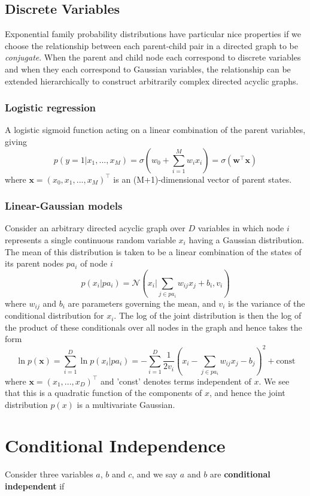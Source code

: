 \documentclass[a3paper, 12pt]{book} %
\begin{document}
\subsection{Discrete Variables}
Exponential family probability distributions have particular nice properties if we choose the relationship between each parent-child pair in a directed graph to be \emph{conjugate}. When the parent and child node each correspond to discrete variables and when they each correspond to Gaussian variables, the relationship can be extended hierarchically to construct arbitrarily complex directed acyclic graphs.

\subsubsection{Logistic regression}
A logistic sigmoid function acting on a linear combination of the parent variables, giving 
$$p(y=1|x_1,...,x_M)=\sigma{(w_0+\sum_{i=1}^{M}{w_ix_i})}=\sigma{(\mathbf{w}^{\top}\mathbf{x})}$$
where $\mathbf{x}=(x_0,x_1,...,x_M)^{\top}$ is an (M+1)-dimensional vector of parent states.
\subsubsection{Linear-Gaussian models}
Consider an arbitrary directed acyclic graph over $D$ variables in which node $i$
represents a single continuous random variable $x_i$ having a Gaussian distribution.
The mean of this distribution is taken to be a linear combination of the states of its
parent nodes $pa_i$ of node $i$
$$p(x_i|pa_i)=\mathcal{N}{(x_i|\sum_{j\in pa_i}{w_{ij}x_j+b_i, v_i})}$$
where $w_{ij}$ and $b_i$ are parameters governing the mean, and $v_i$ is the variance of the
conditional distribution for $x_i$. The log of the joint distribution is then the log of the
product of these conditionals over all nodes in the graph and hence takes the form
$$\ln p{(\mathbf{x})}=\sum_{i=1}^{D}{\ln p(x_i|pa_i)}=-\sum_{i=1}^{D}{\frac{1}{2v_i}(x_i-\sum_{j \in pa_i}{w_{ij}x_j-b_j})^2 + \mathrm{const}}$$
where $\mathbf{x} = (x_1,..., x_D)^\top$ and 'const' denotes terms independent of $x$. We see that
this is a quadratic function of the components of $x$, and hence the joint distribution $p(x)$ is a multivariate Gaussian. 

\section{Conditional Independence}
Consider three variables $a$, $b$ and $c$, and we say $a$ and $b$ are \textbf{conditional independent} if 
\end{document}
